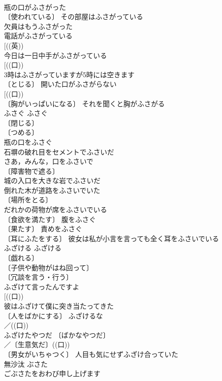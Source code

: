 \documentclass[8pt]{extreport}
\begin{document}
\begin{CJK}{UTF8}{min}
\\	瓶の口がふさがった 
\\	〔使われている〕 その部屋はふさがっている 
\\	欠員はもうふさがった 
\\	電話がふさがっている 
\\	[((英))
\\	今日は一日中手がふさがっている 
\\	[((口))
\\	3時はふさがっていますが5時には空きます 
\\	〔とじる〕 開いた口がふさがらない 
\\	[((口)) 
\\	〔胸がいっぱいになる〕 それを聞くと胸がふさがる 
\\	ふさぐ	ふさぐ	
\\	〔閉じる〕
\\	〔つめる〕
\\	瓶の口をふさぐ 
\\	石塀の破れ目をセメントでふさいだ 
\\	さあ，みんな，口をふさいで 
\\	〔障害物で遮る〕
\\	城の入口を大きな岩でふさいだ 
\\	倒れた木が道路をふさいでいた 
\\	〔場所をとる〕
\\	だれかの荷物が席をふさいでいる 
\\	〔食欲を満たす〕 腹をふさぐ 
\\	〔果たす〕 責めをふさぐ 
\\	〔耳にふたをする〕 彼女は私が小言を言っても全く耳をふさいでいる 
\\	ふざける	ふざける	
\\	〔戯れる〕
\\	〔子供や動物がはね回って〕
\\	〔冗談を言う・行う〕
\\	ふざけて言ったんですよ 
\\	[((口))
\\	彼はふざけて僕に突き当たってきた 
\\	〔人をばかにする〕 ふざけるな 
\\	／((口)) 
\\	ふざけたやつだ 〔ばかなやつだ〕
\\	／〔生意気だ〕((口)) 
\\	〔男女がいちゃつく〕 人目も気にせずふざけ合っていた 
\\	無沙汰	ぶさた	
\\	ごぶさたをおわび申し上げます 

\end{CJK}
\end{document}
